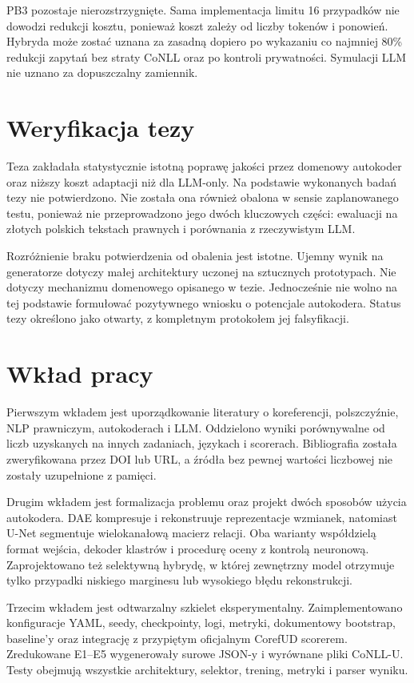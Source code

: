 PB3 pozostaje nierozstrzygnięte. Sama implementacja limitu 16 przypadków nie dowodzi redukcji kosztu, ponieważ koszt zależy od liczby tokenów i ponowień. Hybryda może zostać uznana za zasadną dopiero po wykazaniu co najmniej 80\% redukcji zapytań bez straty CoNLL oraz po kontroli prywatności. Symulacji LLM nie uznano za dopuszczalny zamiennik.

\section{Weryfikacja tezy}

Teza zakładała statystycznie istotną poprawę jakości przez domenowy autokoder oraz niższy koszt adaptacji niż dla LLM-only. Na podstawie wykonanych badań tezy nie potwierdzono. Nie została ona również obalona w sensie zaplanowanego testu, ponieważ nie przeprowadzono jego dwóch kluczowych części: ewaluacji na złotych polskich tekstach prawnych i porównania z rzeczywistym LLM.

Rozróżnienie braku potwierdzenia od obalenia jest istotne. Ujemny wynik na generatorze dotyczy małej architektury uczonej na sztucznych prototypach. Nie dotyczy mechanizmu domenowego opisanego w tezie. Jednocześnie nie wolno na tej podstawie formułować pozytywnego wniosku o potencjale autokodera. Status tezy określono jako otwarty, z kompletnym protokołem jej falsyfikacji.

\section{Wkład pracy}

Pierwszym wkładem jest uporządkowanie literatury o koreferencji, polszczyźnie, NLP prawniczym, autokoderach i LLM. Oddzielono wyniki porównywalne od liczb uzyskanych na innych zadaniach, językach i scorerach. Bibliografia została zweryfikowana przez DOI lub URL, a źródła bez pewnej wartości liczbowej nie zostały uzupełnione z pamięci.

Drugim wkładem jest formalizacja problemu oraz projekt dwóch sposobów użycia autokodera. DAE kompresuje i rekonstruuje reprezentacje wzmianek, natomiast U-Net segmentuje wielokanałową macierz relacji. Oba warianty współdzielą format wejścia, dekoder klastrów i procedurę oceny z kontrolą neuronową. Zaprojektowano też selektywną hybrydę, w której zewnętrzny model otrzymuje tylko przypadki niskiego marginesu lub wysokiego błędu rekonstrukcji.

Trzecim wkładem jest odtwarzalny szkielet eksperymentalny. Zaimplementowano konfiguracje YAML, seedy, checkpointy, logi, metryki, dokumentowy bootstrap, baseline’y oraz integrację z przypiętym oficjalnym CorefUD scorerem. Zredukowane E1--E5 wygenerowały surowe JSON-y i wyrównane pliki CoNLL-U. Testy obejmują wszystkie architektury, selektor, trening, metryki i parser wyniku.

